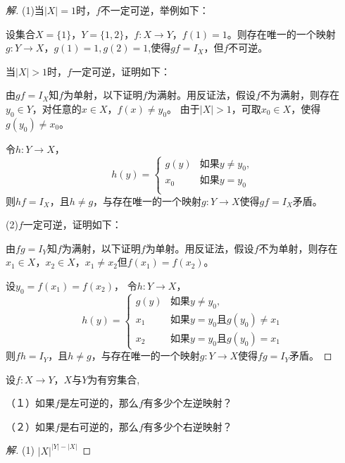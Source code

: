 \documentclass{article}
\begin{document}
\begin{CJK}{UTF8}{gbsn}
\begin{proof}[解]
  (1)当$|X|=1$时，$f$不一定可逆，举例如下：

  设集合$X=\{1\}$，$Y=\{1,2\}$，$f:X\to Y$，$f(1)=1$。则存在唯一的一个映射$g:Y\to X$，$g(1)=1,g(2)=1$,使得$gf=I_X$，但$f$不可逆。

  当$|X|>1$时，$f$一定可逆，证明如下：

  由$gf=I_X$知$f$为单射，以下证明$f$为满射。用反证法，假设$f$不为满射，则存在$y_0\in Y$，对任意的$x\in X$，$f(x)\neq y_0$。
  由于$|X|>1$，可取$x_0\in X$，使得$g(y_0)\neq x_0$。

  令$h:Y\to X$，
  \[h(y)=\begin{cases}
      g(y) &\text{如果} y \neq y_0,\\
      x_0 &\text{如果} y = y_0\\
    \end{cases}
  \]
  则$hf=I_X$，且$h\neq g$，与存在唯一的一个映射$g:Y\to X$使得$gf=I_X$矛盾。
  

  (2)$f$一定可逆，证明如下：

  由$fg=I_Y$知$f$为满射，以下证明$f$为单射。用反证法，假设$f$不为单射，则存在$x_1\in X$，$x_2\in X$，$x_1\neq x_2$但$f(x_1)=f(x_2)$。

  设$y_0=f(x_1)=f(x_2)$，
  令$h:Y\to X$，
  \[h(y)=\begin{cases}
      g(y) &\text{如果} y \neq y_0,\\
      x_1 &\text{如果} y = y_0\text{且} g(y_0) \neq x_1\\
      x_2 &\text{如果} y= y_0 \text{且} g(y_0) = x_1
    \end{cases}
  \]
  则$fh=I_Y$，且$h\neq g$，与存在唯一的一个映射$g:Y\to X$使得$fg=I_Y$矛盾。
\end{proof}

\begin{Exercise}
设$f:X\to Y$，$X$与$Y$为有穷集合,

（１）如果$f$是左可逆的，那么$f$有多少个左逆映射？

（２）如果$f$是右可逆的，那么$f$有多少个右逆映射？
\end{Exercise}
\begin{proof}[解]
  (1) $|X|^{|Y|-|X|}$


\end{proof}
\end{CJK}
\end{document}
